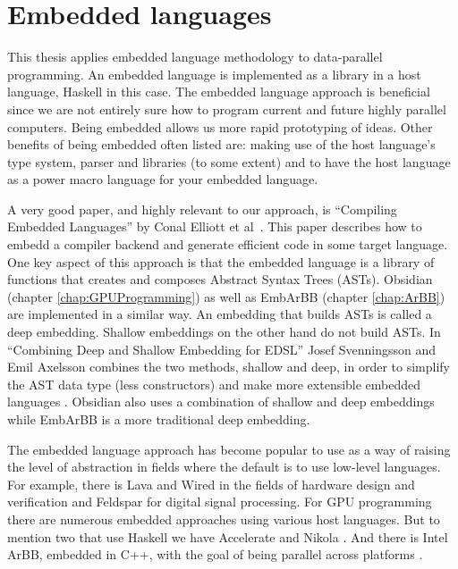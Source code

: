 \documentclass[a4paper]{book}
\begin{document}


\section{Embedded languages}

This thesis applies embedded language methodology to data-parallel programming. An 
embedded language is implemented as a library in a host language, Haskell in this case. 
The embedded language approach is beneficial since we are not entirely sure how 
to program current and future highly parallel computers. Being embedded allows 
us more rapid prototyping of ideas. Other benefits of being embedded often listed 
are: making use of the host language's type system, parser and libraries (to some extent) 
and to have the host language as a power macro language for your embedded language. 

A very good paper, and highly relevant to our approach, is ``Compiling Embedded Languages''
by Conal Elliott et al~\citet{COMPILEEDSL}. This paper describes how to embedd a compiler 
backend and generate efficient code in some target language. One key aspect of this 
approach is that the embedded language is a library of functions that creates and 
composes Abstract Syntax Trees (ASTs). Obsidian (chapter \ref{chap:GPUProgramming}) as 
well as EmbArBB (chapter \ref{chap:ArBB}) are implemented in a similar way. An 
embedding that builds ASTs is called a deep embedding. Shallow embeddings on the 
other hand do not build ASTs. In ``Combining Deep and Shallow Embedding for EDSL'' 
Josef Svenningsson and Emil Axelsson combines the two methods, shallow and deep, 
in order to simplify the AST data type (less constructors) and make more extensible 
embedded languages \citet{DEEPSHALLOW}. Obsidian also uses a combination of shallow 
and deep embeddings while EmbArBB is a more traditional deep embedding. 

The embedded language approach has become popular to use as a way of raising the 
level of abstraction in fields where the default is to use low-level languages. 
For example, there is Lava and Wired in the fields of hardware design and 
verification and Feldspar for digital signal processing\citet{LAVA,Wired,FELDSPAR2010}. For GPU 
programming there are numerous embedded approaches using various host languages. 
But to mention two that use Haskell we have Accelerate and Nikola 
\citet{ACCELERATEDAMP11, NIKOLA}. And there is Intel ArBB, embedded in C++, with the 
goal of being parallel across platforms \citet{ARBB2011}.
\end{document}
